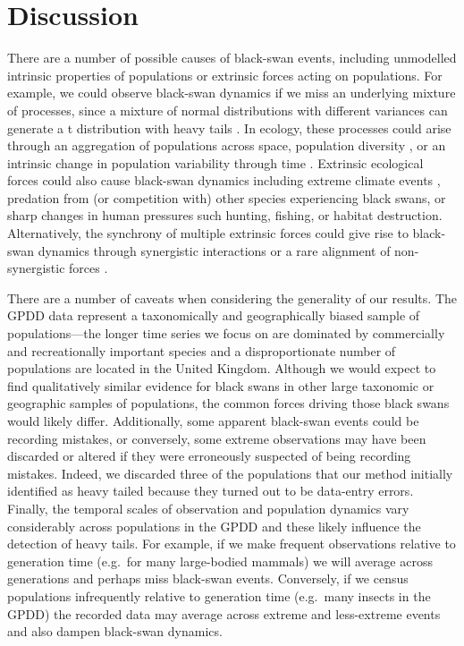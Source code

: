\section{Discussion}

There are a number of possible causes of black-swan events, including
unmodelled intrinsic properties of populations or extrinsic forces acting on
populations. For example, we could observe black-swan dynamics if we miss an
underlying mixture of processes, since a mixture of normal distributions with
different variances can generate a t distribution with heavy
tails \citep{allen2001}. In ecology, these processes could arise through an
aggregation of populations across space, population
diversity \citep{schindler2010}, or an intrinsic change in population variability
through time \citep{carpenter2006}. Extrinsic ecological forces could also cause
black-swan dynamics \citep{nunez2012} including extreme climate
events \citep{meehl2004, katz2005, ipcc2012}, predation from (or competition
with) other species experiencing black swans, or sharp changes in human
pressures such hunting, fishing, or habitat destruction. Alternatively, the
synchrony of multiple extrinsic forces could give rise to black-swan dynamics
through synergistic interactions \citep{kirby2009} or a rare alignment of
non-synergistic forces \citep{denny2009}.

There are a number of caveats when considering the generality of our results.
The GPDD data represent a taxonomically and geographically biased sample of
populations---the longer time series we focus on are dominated by commercially
and recreationally important species and a disproportionate number of
populations are located in the United Kingdom. Although we would expect to find
qualitatively similar evidence for black swans in other large taxonomic or
geographic samples of populations, the common forces driving those black swans
would likely differ. Additionally, some apparent black-swan events could be
recording mistakes, or conversely, some extreme observations may have been
discarded or altered if they were erroneously suspected of being recording
mistakes. Indeed, we discarded three of the populations that our method
initially identified as heavy tailed because they turned out to be data-entry
errors. Finally, the temporal scales of observation and population dynamics
vary considerably across populations in the GPDD and these likely influence the
detection of heavy tails. For example, if we make frequent observations
relative to generation time (e.g.~for many large-bodied mammals) we will
average across generations and perhaps miss black-swan events. Conversely, if
we census populations infrequently relative to generation time (e.g.~many
insects in the GPDD) the recorded data may average across extreme and
less-extreme events and also dampen black-swan dynamics.

